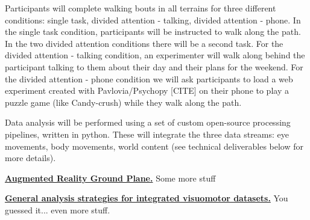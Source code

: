 Participants will complete walking bouts in all terrains for three
different conditions: single task, divided attention - talking, divided attention - phone. In the single task condition, participants will be instructed to walk along the path. In the two divided attention conditions there will be a second task. For the divided attention - talking condition, an experimenter will walk along behind the participant talking to them about their day and their plans for the weekend. For the divided attention - phone condition we will ask participants to load a web experiment created with Pavlovia/Psychopy [CITE] on their phone to play a puzzle game (like Candy-crush) while they walk along the path.

Data analysis will be performed using a set of custom open-source
processing pipelines, written in python. These will integrate the three data streams: eye movements, body movements, world content (see technical deliverables below for more details).

\noindent \textbf{\underline{Augmented Reality Ground Plane.}} Some more stuff

\noindent \textbf{\underline{General analysis strategies for integrated visuomotor datasets.}} You guessed it... even more stuff.
